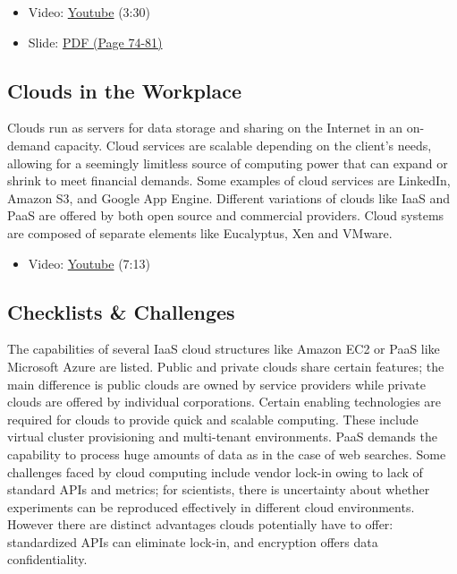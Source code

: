\begin{itemize}
\tightlist
\item
  Video: \href{https://www.youtube.com/watch?v=mvXBRvTwAVg}{Youtube}
  (3:30)
\item
  Slide:
  \href{https://drive.google.com/open?id=0B88HKpainTSfQU1uQmxZWHdWQ1k}{PDF
  (Page 74-81)}
\end{itemize}

\subsection{Clouds in the Workplace}\label{clouds-in-the-workplace}

Clouds run as servers for data storage and sharing on the Internet in an
on-demand capacity. Cloud services are scalable depending on the
client's needs, allowing for a seemingly limitless source of computing
power that can expand or shrink to meet financial demands. Some examples
of cloud services are LinkedIn, Amazon S3, and Google App Engine.
Different variations of clouds like IaaS and PaaS are offered by both
open source and commercial providers. Cloud systems are composed of
separate elements like Eucalyptus, Xen and VMware.

\begin{itemize}
\tightlist
\item
  Video: \href{https://www.youtube.com/watch?v=Endt6mWUfEo}{Youtube}
  (7:13)
\end{itemize}

\subsection{Checklists \& Challenges}\label{checklists-challenges}

The capabilities of several IaaS cloud structures like Amazon EC2 or
PaaS like Microsoft Azure are listed. Public and private clouds share
certain features; the main difference is public clouds are owned by
service providers while private clouds are offered by individual
corporations. Certain enabling technologies are required for clouds to
provide quick and scalable computing. These include virtual cluster
provisioning and multi-tenant environments. PaaS demands the capability
to process huge amounts of data as in the case of web searches. Some
challenges faced by cloud computing include vendor lock-in owing to lack
of standard APIs and metrics; for scientists, there is uncertainty about
whether experiments can be reproduced effectively in different cloud
environments. However there are distinct advantages clouds potentially
have to offer: standardized APIs can eliminate lock-in, and encryption
offers data confidentiality.

